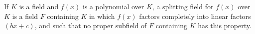 If $K$ is a field and $f(x)$ is a polynomial over $K$, a splitting field for $f(x)$ over $K$ is a field $F$ containing $K$ in which $f(x)$ factors completely into linear factors $(bx + c)$, and such that no proper subfield of $F$ containing $K$ has this property.
